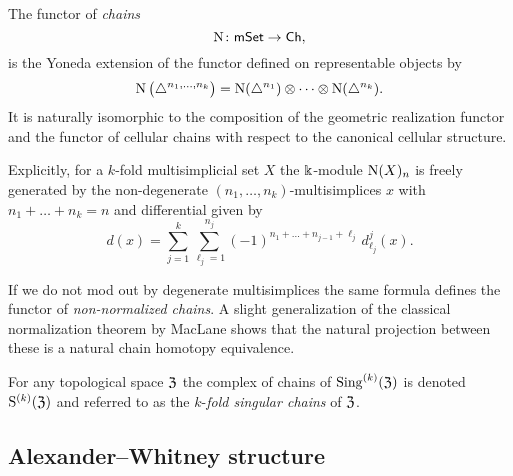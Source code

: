 The functor of \textit{chains}
\[
\operatorname{N} \colon \mathsf{mSet} \to \mathsf{Ch},
\]
is the Yoneda extension of the functor defined on representable objects by
\[
\operatorname{N} \big( \triangle^{n_1, \dots, n_k} \big) =
\operatorname{N}(\triangle^{n_1}) \otimes \dotsb \otimes \operatorname{N}(\triangle^{n_k}).
\]
It is naturally isomorphic to the composition of the geometric realization functor and the functor of cellular chains with respect to the canonical cellular structure.

Explicitly, for a $k$-fold multisimplicial set $X$ the $\Bbbk$-module $\operatorname{N}(X)_n$ is freely generated by the non-degenerate $(n_1, \dots, n_k)$-multisimplices $x$ with $n_1+\dots+n_k = n$ and differential given by
\[
d(x) = \sum_{j=1}^k \sum_{\ell_j=1}^{n_j}
(-1)^{n_{1}+\dots+n_{j-1}+\ell_j} \, d^j_{\ell_j}(x).
\]

\begin{remark*}
	If we do not mod out by degenerate multisimplices the same formula defines the functor of \textit{non-normalized chains}.
	A slight generalization of the classical normalization theorem by MacLane \cite{MacLane} shows that the natural projection between these is a natural chain homotopy equivalence. 
\end{remark*}

For any topological space $\mathfrak{Z}$ the complex of chains of $\operatorname{Sing}^{(k)}(\mathfrak{Z})$ is denoted $\mathrm{S}^{(k)}(\mathfrak{Z})$ and referred to as the $k$-\textit{fold singular chains} of $\mathfrak{Z}$.

\subsection{Alexander--Whitney structure}

